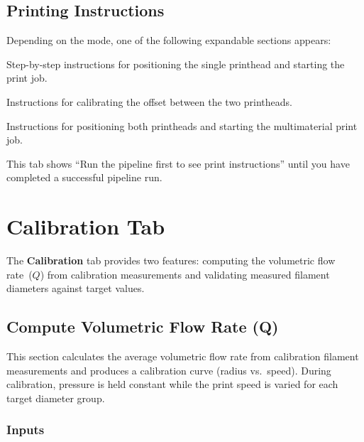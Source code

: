 \documentclass[11pt,letterpaper]{article}
\newcommand{\gui}[1]{\textcolor{guicolor}{\textsf{\textbf{#1}}}}
\begin{document}
\subsection{Printing Instructions}

Depending on the mode, one of the following expandable sections appears:

\begin{description}[style=nextline]
    \item[\gui{Single Material Instructions}]
    Step-by-step instructions for positioning the single printhead and starting
    the print job.
    \item[\gui{Multimaterial Calibration}]
    Instructions for calibrating the offset between the two printheads.
    \item[\gui{Multimaterial Positioning}]
    Instructions for positioning both printheads and starting the multimaterial
    print job.
\end{description}

\begin{infobox}
This tab shows ``Run the pipeline first to see print instructions'' until you
have completed a successful pipeline run.
\end{infobox}

\section{Calibration Tab}
\label{sec:calibration}

The \gui{Calibration} tab provides two features: computing the volumetric flow
rate~($Q$) from calibration measurements and validating measured filament
diameters against target values.

\subsection{Compute Volumetric Flow Rate (Q)}

This section calculates the average volumetric flow rate from calibration
filament measurements and produces a calibration curve (radius vs.\ speed).
During calibration, pressure is held constant while the print speed is varied
for each target diameter group.

\subsubsection{Inputs}
\end{document}
